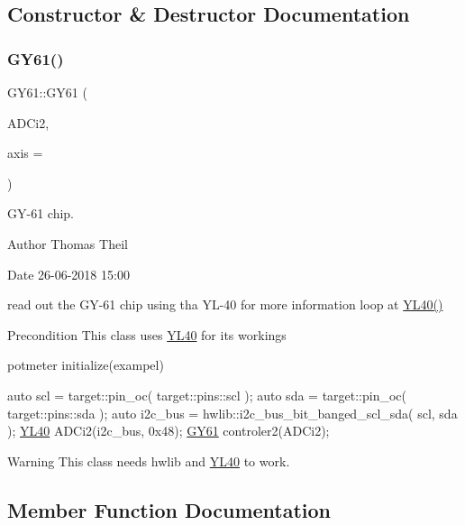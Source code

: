 \subsection{Constructor \& Destructor Documentation}
\mbox{\label{class_g_y61_a18b9202457ceaa7187b2b85032970119}} 
\subsubsection{\texorpdfstring{G\+Y61()}{GY61()}}
{\footnotesize\ttfamily G\+Y61\+::\+G\+Y61 (\begin{DoxyParamCaption}\item[{\mbox{\hyperlink{class_y_l40}{Y\+L40}} \&}]{A\+D\+Ci2,  }\item[{char}]{axis = {} }\end{DoxyParamCaption})}



G\+Y-\/61 chip. 

\begin{DoxyAuthor}{Author}
Thomas Theil 
\end{DoxyAuthor}
\begin{DoxyDate}{Date}
26-\/06-\/2018 15\+:00
\end{DoxyDate}
read out the G\+Y-\/61 chip using tha Y\+L-\/40 for more information loop at \mbox{\hyperlink{class_y_l40}{Y\+L40()}}

\begin{DoxyPrecond}{Precondition}
This class uses \mbox{\hyperlink{class_y_l40}{Y\+L40}} for its workings 
\end{DoxyPrecond}
potmeter initialize(exampel) 
\begin{DoxyCode}
\textcolor{keyword}{auto} scl     = target::pin\_oc( target::pins::scl );
\textcolor{keyword}{auto} sda      = target::pin\_oc( target::pins::sda );
\textcolor{keyword}{auto} i2c\_bus = hwlib::i2c\_bus\_bit\_banged\_scl\_sda( scl, sda );
\mbox{\hyperlink{class_y_l40}{YL40}} ADCi2(i2c\_bus, 0x48);
\mbox{\hyperlink{class_g_y61}{GY61}} controler2(ADCi2);
\end{DoxyCode}


\begin{DoxyWarning}{Warning}
This class needs hwlib and \mbox{\hyperlink{class_y_l40}{Y\+L40}} to work. 
\end{DoxyWarning}


\subsection{Member Function Documentation}
\mbox{\label{class_g_y61_a3163809be7dd33dc0c46ba503b55394a}} 

